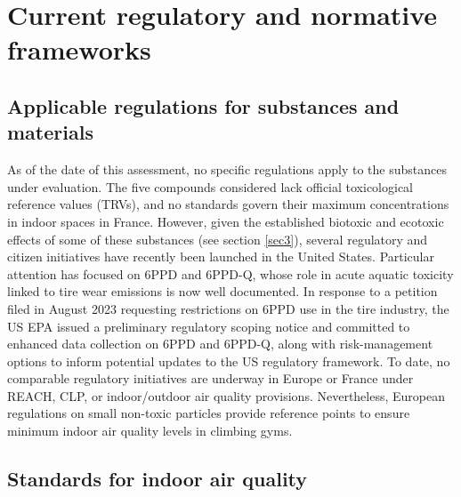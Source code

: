 \documentclass[pdflatex,sn-basic]{sn-jnl}%
\begin{document}

\section{Current regulatory and normative frameworks}
\label{sec4}

\subsection{Applicable regulations for substances and materials}
\label{subsec10}

As of the date of this assessment, no specific regulations apply to the substances under evaluation. The five compounds considered lack official toxicological reference values (TRVs), and no standards govern their maximum concentrations in indoor spaces in France. However, given the established biotoxic and ecotoxic effects of some of these substances (see section \ref{sec3}), several regulatory and citizen initiatives have recently been launched in the United States. Particular attention has focused on 6PPD and 6PPD-Q, whose role in acute aquatic toxicity linked to tire wear emissions is now well documented. In response to a petition filed in August 2023  requesting restrictions on 6PPD use in the tire industry, the US EPA issued a preliminary regulatory scoping notice and committed to enhanced data collection on 6PPD and 6PPD-Q, along with risk-management options to inform potential updates to the US regulatory framework.
To date, no comparable regulatory initiatives are underway in Europe or France under REACH, CLP, or indoor/outdoor air quality provisions. Nevertheless, European regulations on small non-toxic particles provide reference points to ensure minimum indoor air quality levels in climbing gyms.

\subsection{Standards for indoor air quality}
\label{subsec11}
\end{document}
